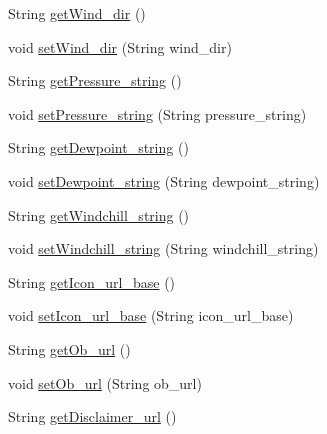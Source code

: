 \begin{DoxyCompactItemize}
\item 
String \hyperlink{classgov_1_1fnal_1_1ppd_1_1dd_1_1xml_1_1news_1_1current__observation_a27c0106d7540d7de181b9014e1f3a975}{get\-Wind\-\_\-dir} ()
\item 
void \hyperlink{classgov_1_1fnal_1_1ppd_1_1dd_1_1xml_1_1news_1_1current__observation_ac684e34c25594be70e5aa43e06fb9cb1}{set\-Wind\-\_\-dir} (String wind\-\_\-dir)
\item 
String \hyperlink{classgov_1_1fnal_1_1ppd_1_1dd_1_1xml_1_1news_1_1current__observation_a82347dbbad7d4f6bbc3ab34a9131e0fa}{get\-Pressure\-\_\-string} ()
\item 
void \hyperlink{classgov_1_1fnal_1_1ppd_1_1dd_1_1xml_1_1news_1_1current__observation_a3d6835d1f2b1f99b8be58cf4bb6c80eb}{set\-Pressure\-\_\-string} (String pressure\-\_\-string)
\item 
String \hyperlink{classgov_1_1fnal_1_1ppd_1_1dd_1_1xml_1_1news_1_1current__observation_acbe848c5f8b6453658c9d2badc1cd011}{get\-Dewpoint\-\_\-string} ()
\item 
void \hyperlink{classgov_1_1fnal_1_1ppd_1_1dd_1_1xml_1_1news_1_1current__observation_acab46094a23e14489b3cf21d112467c6}{set\-Dewpoint\-\_\-string} (String dewpoint\-\_\-string)
\item 
String \hyperlink{classgov_1_1fnal_1_1ppd_1_1dd_1_1xml_1_1news_1_1current__observation_a9da2b1b9eb654028083d4f6e9fb0bf62}{get\-Windchill\-\_\-string} ()
\item 
void \hyperlink{classgov_1_1fnal_1_1ppd_1_1dd_1_1xml_1_1news_1_1current__observation_aee64af3d25b077531dddf9589460d478}{set\-Windchill\-\_\-string} (String windchill\-\_\-string)
\item 
String \hyperlink{classgov_1_1fnal_1_1ppd_1_1dd_1_1xml_1_1news_1_1current__observation_ac648e580cf6f409fa2fa92cca308d283}{get\-Icon\-\_\-url\-\_\-base} ()
\item 
void \hyperlink{classgov_1_1fnal_1_1ppd_1_1dd_1_1xml_1_1news_1_1current__observation_a1289137d6b2e59017463bec28619703a}{set\-Icon\-\_\-url\-\_\-base} (String icon\-\_\-url\-\_\-base)
\item 
String \hyperlink{classgov_1_1fnal_1_1ppd_1_1dd_1_1xml_1_1news_1_1current__observation_a2ba85dea1b3b8dac60105584e7a8e719}{get\-Ob\-\_\-url} ()
\item 
void \hyperlink{classgov_1_1fnal_1_1ppd_1_1dd_1_1xml_1_1news_1_1current__observation_af9015ae62b5cb146adf13a173d5446fc}{set\-Ob\-\_\-url} (String ob\-\_\-url)
\item 
String \hyperlink{classgov_1_1fnal_1_1ppd_1_1dd_1_1xml_1_1news_1_1current__observation_a7253ccb7f6973e3095b905a92913f03c}{get\-Disclaimer\-\_\-url} ()

\end{DoxyCompactItemize}

